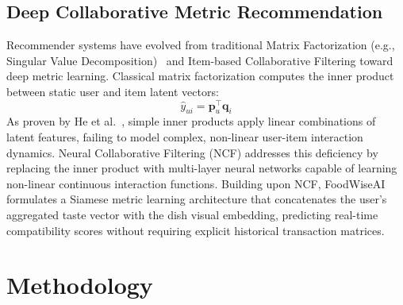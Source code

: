 \documentclass[10pt,journal,compsoc]{IEEEtran}
\begin{document}
\subsection{Deep Collaborative Metric Recommendation}
Recommender systems have evolved from traditional Matrix Factorization (e.g., Singular Value Decomposition)~\cite{koren2009} and Item-based Collaborative Filtering toward deep metric learning. Classical matrix factorization computes the inner product between static user and item latent vectors:
\begin{equation}
    \hat{y}_{ui} = \mathbf{p}_u^\top \mathbf{q}_i
\end{equation}
As proven by He et al.~\cite{he2017}, simple inner products apply linear combinations of latent features, failing to model complex, non-linear user-item interaction dynamics. Neural Collaborative Filtering (NCF) addresses this deficiency by replacing the inner product with multi-layer neural networks capable of learning non-linear continuous interaction functions. Building upon NCF, FoodWiseAI formulates a Siamese metric learning architecture that concatenates the user's aggregated taste vector with the dish visual embedding, predicting real-time compatibility scores without requiring explicit historical transaction matrices.

\section{Methodology}
\end{document}
